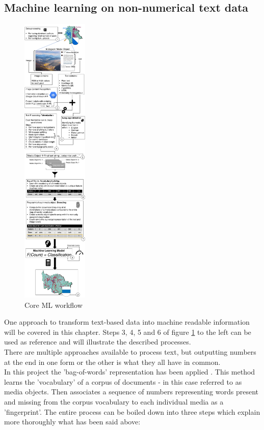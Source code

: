 \subsection{Machine learning on non-numerical text data} \label{ml_text_data}
\begin{figure} %
  \vspace{-0.5cm}
    \centerline{\includegraphics[trim={0 0 0 0},clip,width=0.28\textwidth]{img/ML_visualisation.pdf}}
  \caption{Core ML workflow}
  \label{fig:ml_visualisation}
\end{figure}
One approach to transform text-based data into machine readable information will be covered in this chapter. Steps 3, 4, 5 and 6 of figure \ref{fig:ml_visualisation} to the left can be used as reference and will illustrate the described processes.\\
There are multiple approaches available to process text, but outputting numbers at the end in one form or the other is what they all have in common.\\
In this project the 'bag-of-words' representation has been applied \parencite{Joulin2016}. This method learns the 'vocabulary' of a corpus of documents - in this case referred to as media objects. Then associates a sequence of numbers representing words present and missing from the corpus vocabulary to each individual media as a 'fingerprint'. The entire process can be boiled down into three steps which explain more thoroughly what has been said above:


